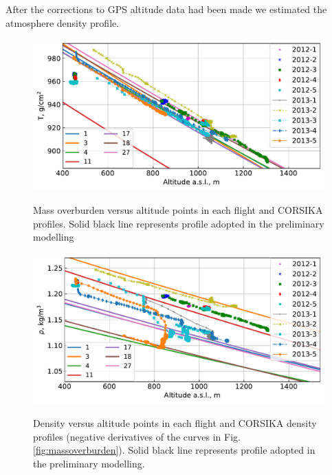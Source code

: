 \documentclass[final,5p,times,twocolumn]{elsarticle}
\begin{document}
After the corrections to GPS altitude data had been made we estimated the atmosphere density profile.

\begin{figure}[bt]
\centering
\begin{minipage}[t]{0.48\textwidth}
    \includegraphics[width=\textwidth]{atmosphere_T.pdf}
    \vspace{-1.0pc}
    \caption{Mass overburden versus altitude points in each flight and CORSIKA profiles. Solid black line represents profile adopted in the preliminary modelling}
\label{fig:massoverburden}
\end{minipage}
\vfill
\vspace{1pc}
\begin{minipage}[t]{0.48\textwidth}
    \includegraphics[width=\textwidth]{atmosphere_rho.pdf}
    \vspace{-1.0pc}
    \caption{Density versus altitude points in each flight and CORSIKA density profiles (negative derivatives of the curves in Fig. \ref{fig:massoverburden}). Solid black line represents profile adopted in the preliminary modelling.}
\label{fig:density}
\end{minipage}
\end{figure}
\end{document}
